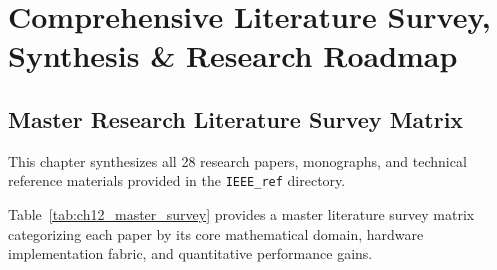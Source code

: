 \chapter{Comprehensive Literature Survey, Synthesis \& Research Roadmap}
\label{ch:synthesis}

\section{Master Research Literature Survey Matrix}
This chapter synthesizes all 28 research papers, monographs, and technical reference materials provided in the \texttt{IEEE\_ref} directory. 

Table~\ref{tab:ch12_master_survey} provides a master literature survey matrix categorizing each paper by its core mathematical domain, hardware implementation fabric, and quantitative performance gains.

